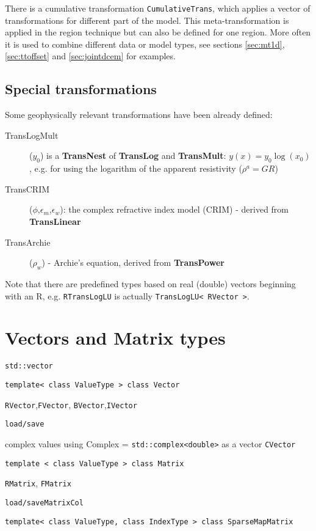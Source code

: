 There is a cumulative transformation \lstinline|CumulativeTrans|, which applies a vector of transformations for different part of the model.
This meta-transformation is applied in the region technique but can also be defined for one region.
More often it is used to combine different data or model types, see sections \ref{sec:mt1d}, \ref{sec:ttoffset} and \ref{sec:jointdcem} for examples.

\subsection*{Special transformations}
Some geophysically relevant transformations have been already defined:
\begin{description}
\item[TransLogMult]($y_0$) is a {\bf TransNest} of {\bf TransLog} and {\bf TransMult}: $y(x)=y_0\log(x_0)$, e.g. for using the logarithm of the apparent resistivity ($\rho^a=G R$)
\item[TransCRIM]($\phi$,$\epsilon_m$,$\epsilon_w$): the complex refractive index model (CRIM) - derived from {\bf TransLinear}
\item[TransArchie]($\rho_w$) - Archie's equation, derived from {\bf TransPower}
\end{description}

Note that there are predefined types based on real (double) vectors beginning with an R, e.g. \lstinline|RTransLogLU| is actually \lstinline|TransLogLU< RVector >|.


\section{Vectors and Matrix types}\label{app:matrix}
\sperre

\lstinline|std::vector|

\lstinline|template< class ValueType > class Vector|

\lstinline|RVector|,\lstinline|FVector|, \lstinline|BVector|,\lstinline|IVector|

\lstinline|load/save|

complex values using Complex = \lstinline|std::complex<double>| as a vector \lstinline|CVector|

\lstinline|template < class ValueType > class Matrix|

\lstinline|RMatrix|, \lstinline|FMatrix|

\lstinline|load/saveMatrixCol|

\lstinline|template< class ValueType, class IndexType > class SparseMapMatrix|

